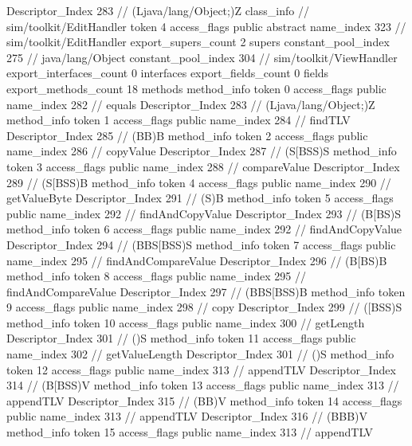 {{{{{					Descriptor_Index	283		// (Ljava/lang/Object;)Z
				}
			}
		}
		class_info {		// sim/toolkit/EditHandler
			token	4
			access_flags	public abstract
			name_index	323		// sim/toolkit/EditHandler
			export_supers_count	2
			supers {
				constant_pool_index	275		// java/lang/Object
				constant_pool_index	304		// sim/toolkit/ViewHandler
			}
			export_interfaces_count	0
			interfaces {
			}
			export_fields_count	0
			fields {
			}
			export_methods_count	18
			methods {
				method_info {
					token	0
					access_flags	public
					name_index	282		// equals
					Descriptor_Index	283		// (Ljava/lang/Object;)Z
				}
				method_info {
					token	1
					access_flags	public
					name_index	284		// findTLV
					Descriptor_Index	285		// (BB)B
				}
				method_info {
					token	2
					access_flags	public
					name_index	286		// copyValue
					Descriptor_Index	287		// (S[BSS)S
				}
				method_info {
					token	3
					access_flags	public
					name_index	288		// compareValue
					Descriptor_Index	289		// (S[BSS)B
				}
				method_info {
					token	4
					access_flags	public
					name_index	290		// getValueByte
					Descriptor_Index	291		// (S)B
				}
				method_info {
					token	5
					access_flags	public
					name_index	292		// findAndCopyValue
					Descriptor_Index	293		// (B[BS)S
				}
				method_info {
					token	6
					access_flags	public
					name_index	292		// findAndCopyValue
					Descriptor_Index	294		// (BBS[BSS)S
				}
				method_info {
					token	7
					access_flags	public
					name_index	295		// findAndCompareValue
					Descriptor_Index	296		// (B[BS)B
				}
				method_info {
					token	8
					access_flags	public
					name_index	295		// findAndCompareValue
					Descriptor_Index	297		// (BBS[BSS)B
				}
				method_info {
					token	9
					access_flags	public
					name_index	298		// copy
					Descriptor_Index	299		// ([BSS)S
				}
				method_info {
					token	10
					access_flags	public
					name_index	300		// getLength
					Descriptor_Index	301		// ()S
				}
				method_info {
					token	11
					access_flags	public
					name_index	302		// getValueLength
					Descriptor_Index	301		// ()S
				}
				method_info {
					token	12
					access_flags	public
					name_index	313		// appendTLV
					Descriptor_Index	314		// (B[BSS)V
				}
				method_info {
					token	13
					access_flags	public
					name_index	313		// appendTLV
					Descriptor_Index	315		// (BB)V
				}
				method_info {
					token	14
					access_flags	public
					name_index	313		// appendTLV
					Descriptor_Index	316		// (BBB)V
				}
				method_info {
					token	15
					access_flags	public
					name_index	313		// appendTLV
}}}}}
